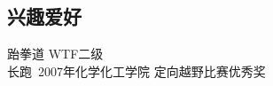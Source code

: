 \documentclass{res}
\begin{document}
\begin{CJK}{UTF8}{gbsn}
\begin{resume}
\section{兴趣爱好}          
    跆拳道 WTF二级\\
   长跑\quad\,  2007年化学化工学院 定向越野比赛优秀奖          
 
\end{resume}
\end{CJK}
\end{document}

